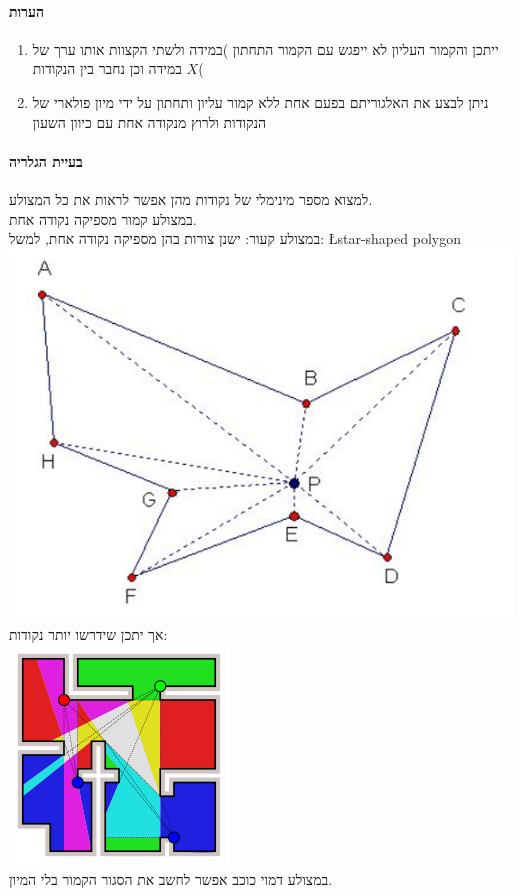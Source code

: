\documentclass{article}
\begin{document}
\paragraph{הערות }
\begin{enumerate}
\item ייתכן והקמור העליון לא ייפגש עם הקמור התחתון )במידה ולשתי הקצוות אותו ערך של $X$ במידה וכן נחבר בין הנקודות(
\item ניתן לבצע את האלגוריתם בפעם אחת ללא קמור עליון ותחתון על ידי מיון פולארי של הנקודות ולרוץ מנקודה אחת עם כיוון השעון
\end{enumerate}


\paragraph{בעיית הגלריה }
למצוא מספר מינימלי של נקודות מהן אפשר לראות את כל המצולע.\\
במצולע קמור מספיקה נקודה אחת.\\
במצולע קעור: ישנן צורות בהן מספיקה נקודה אחת, למשל: \L{star-shaped polygon}\\
\includegraphics[scale=0.3]{z3.png}
\\
אך יתכן שידרשו יותר נקודות:\\
\includegraphics[scale=0.3]{z2.png}
\\
במצולע דמוי כוכב אפשר לחשב את הסגור הקמור בלי המיון.\\
\end{document}
